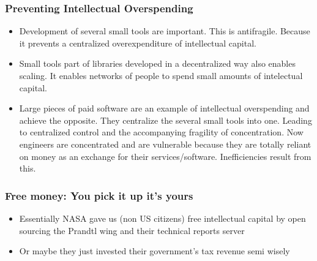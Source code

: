 \documentclass{beamer}
\begin{document}
\begin{frame}
\frametitle{Preventing Intellectual Overspending}

\begin{itemize}
\item Development of several small tools are important. This is antifragile. Because it prevents a centralized overexpenditure of intellectual capital.
\item Small tools part of libraries developed in a decentralized way also enables scaling.  It enables networks of people to spend small amounts of intelectual capital.
\item  Large pieces of paid software are an example of intellectual overspending and achieve the opposite.  They centralize the several small tools into one.  Leading to centralized control and the accompanying fragility of concentration.  Now engineers are concentrated and are vulnerable because they are totally reliant on money as an exchange for their services/software.  Inefficiencies result from this.
\end{itemize}

\end{frame}


\begin{frame}
\frametitle{Free money:  You pick it up it's yours}

\begin{itemize}
\item Essentially NASA gave us (non US citizens) free intellectual capital by open sourcing the Prandtl wing and their technical reports server
\item Or maybe they just invested their government's tax revenue semi wisely
\end{itemize}

\end{frame}  
\end{document}
